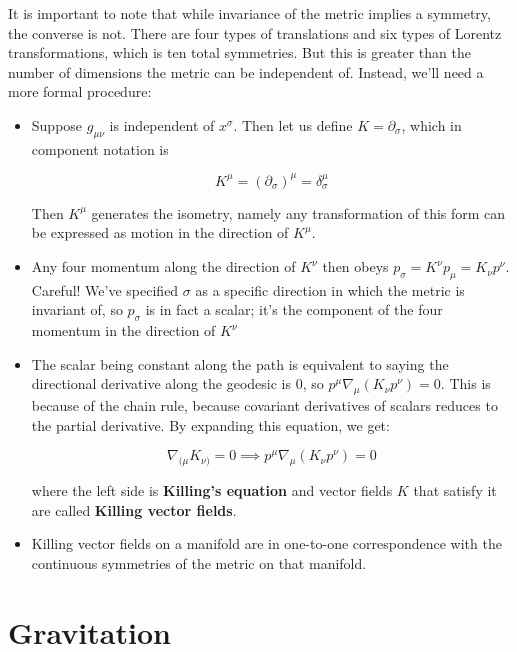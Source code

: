 \documentclass[11pt]{article}
\begin{document}
\noindent It is important to note that while invariance of the metric implies a symmetry, the converse is not. There are four types of translations and six types of Lorentz transformations, which is ten total symmetries. But this is greater than the number
of dimensions the metric can be independent of. Instead, we'll need a more formal procedure:
\begin{itemize}
    \item Suppose \( g_{\mu\nu} \) is independent of \( x^{\sigma} \). Then let us define \( K = \partial_{\sigma} \), which in component notation is
    
    \[ 
        K^{\mu} = (\partial_{\sigma})^{\mu} = \delta^{\mu}_\sigma 
    \]

    Then \( K^{\mu} \) generates the isometry, namely any transformation of this form can be expressed as motion in the direction of \( K^{\mu} \).

    \item Any four momentum along the direction of \( K^{\nu} \) then obeys \( p_{\sigma} = K^{\nu}p_{\mu} = K_{\nu}p^{\nu} \). Careful! We've specified \( \sigma \) as a specific direction in which the metric is invariant of, so \( p_{\sigma} \) is in fact a scalar;
    it's the component of the four momentum in the direction of \( K^{\nu} \)

    \item The scalar being constant along the path is equivalent to saying the directional derivative along the geodesic is 0, so \( p^{\mu}\nabla_{\mu}(K_{\nu}p^{\nu}) = 0 \). This is because of the chain rule, because covariant derivatives of scalars reduces to the partial 
    derivative. By expanding this equation, we get:
    
    \[ 
        \nabla_{(\mu}K_{\nu)} = 0 \implies p^{\mu}\nabla_{\mu}(K_{\nu}p^{\nu}) = 0 
    \]

    where the left side is \textbf{Killing's equation} and vector fields \( K \) that satisfy it are called \textbf{Killing vector fields}.

    \item Killing vector fields on a manifold are in one-to-one correspondence with the continuous symmetries of the metric on that manifold. 
\end{itemize}


\section{Gravitation}
\end{document}
